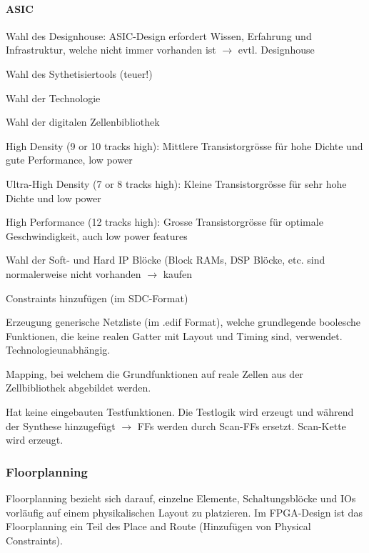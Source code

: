 \paragraph{ASIC}
\begin{compactitem}
    \item Wahl des Designhouse: ASIC-Design erfordert Wissen, Erfahrung und Infrastruktur, welche nicht immer vorhanden ist $\rightarrow$ evtl. Designhouse
    \item Wahl des Sythetisiertools (teuer!)
    \item Wahl der Technologie
    \item Wahl der digitalen Zellenbibliothek
    \begin{compactitem}
        \item High Density (9 or 10 tracks high): Mittlere Transistorgrösse für hohe Dichte und gute Performance, low power
        \item Ultra-High Density (7 or 8 tracks high): Kleine Transistorgrösse für sehr hohe Dichte und low power
        \item High Performance (12 tracks high): Grosse Transistorgrösse für optimale Geschwindigkeit, auch low power features
    \end{compactitem}
    \item Wahl der Soft- und Hard IP Blöcke (Block RAMs, DSP Blöcke, etc. sind normalerweise nicht vorhanden $\rightarrow$ kaufen
    \item Constraints hinzufügen (im SDC-Format)
    \item Erzeugung generische Netzliste (im .edif Format), welche grundlegende boolesche Funktionen, die keine realen Gatter mit Layout und Timing sind, verwendet. Technologieunabhängig.
    \item Mapping, bei welchem die Grundfunktionen auf reale Zellen aus der Zellbibliothek abgebildet werden.
    \item Hat keine eingebauten Testfunktionen. Die Testlogik wird erzeugt und während der Synthese hinzugefügt $\rightarrow$ FFs werden durch Scan-FFs ersetzt. Scan-Kette wird erzeugt.
\end{compactitem}

\subsubsection{Floorplanning}
Floorplanning bezieht sich darauf, einzelne Elemente, Schaltungsblöcke und IOs vorläufig auf einem physikalischen Layout zu platzieren. Im FPGA-Design ist das Floorplanning ein Teil des Place and Route (Hinzufügen von Physical Constraints).


